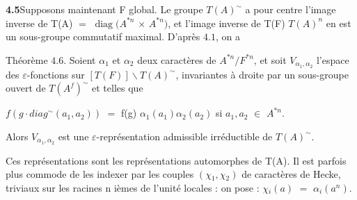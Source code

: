 \documentclass[10pt,a4paper]{article}
\begin{document}
\par\noindent\textbf{4.5}\quad Supposons maintenant F global. Le groupe $T(A)^\sim$ a pour centre l'image inverse de T(A) $=$ $\operatorname{diag}(A^{*n}$ $\times{}$ $A^{*n})$, et l'image inverse de T(F) $T(A)^n$ en est un sous-groupe commutatif maximal. D'après $4.1$, on a\par
\par Théorème $4.6$. Soient $\alpha{}_1$ et $\alpha{}_2$ deux caractères de $A^{*n}/F^{*n}$, et soit $V_{\alpha{}_1,\alpha{}_2}$ l'espace des $\varepsilon{}$-fonctions sur $[T(F)]\backslash T(A)^\sim$, invariantes à droite par un sous-groupe ouvert de $T(A^f)^\sim$ et telles que\par
\par\smallskip\begin{center}\begin{minipage}{0.96\textwidth}\centering
$f(g\cdot{}diag^\sim(a_1,a_2))$ $=$ f(g) $\alpha{}_1(a_1)\alpha{}_2(a_2)$ si $a_1,a_2$ $\in{}$ $A^{*n}$.
\end{minipage}\end{center}\smallskip
\par Alors $V_{\alpha{}_1,\alpha{}_2}$ est une $\varepsilon{}$-représentation admissible irréductible de $T(A)^\sim$.\par
\par Ces représentations sont les représentations automorphes de T(A). Il est parfois plus commode de les indexer par les couples $(\chi{}_1,\chi{}_2)$ de caractères de Hecke, triviaux sur les racines n ièmes de l'unité locales : on pose : $\chi{}_i(a)$ $=$ $\alpha{}_i(a^n)$.\par
\end{document}
